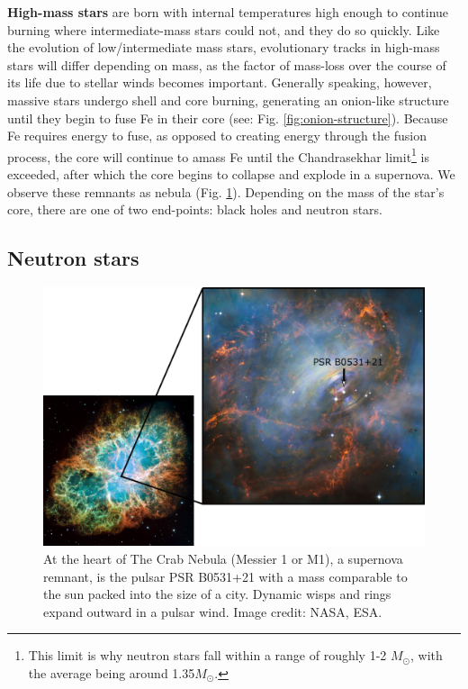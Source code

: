 \documentclass[1.5,11pt]{beavtex}
\begin{document}
\textbf{High-mass stars} are born with internal temperatures high enough to continue burning where intermediate-mass stars could not, and they do so quickly. Like the evolution of low/intermediate mass stars, evolutionary tracks in high-mass stars will differ depending on mass, as the factor of mass-loss over the course of its life due to stellar winds becomes important. Generally speaking, however, massive stars undergo shell and core burning, generating an onion-like structure until they begin to fuse Fe in their core (see: Fig. \ref{fig:onion-structure}). Because Fe requires energy to fuse, as opposed to creating energy through the fusion process, the core will continue to amass Fe until the Chandrasekhar limit\footnote{\selectfont This limit is why neutron stars fall within a range of roughly 1-2 \(M_\odot\), with the average being around 1.35\(M_\odot\). } is exceeded, after which the core begins to collapse and explode in a supernova. We observe these remnants as nebula (Fig. \ref{fig:crab-nebula}). Depending on the mass of the star's core, there are one of two end-points: black holes and neutron stars. 


\subsection{Neutron stars} 
\label{ch:Astro theory ssec:NSs}

\begin{figure}[ht!]
  \centering
  \includegraphics[scale=0.40]{images/ch2/Crab-nebula.png}
  \caption{\selectfont At the heart of The Crab Nebula (Messier 1 or M1), a supernova remnant, is the pulsar PSR B0531+21 with a mass comparable to the sun packed into the size of a city. Dynamic wisps and rings expand outward in a pulsar wind. Image credit: NASA, ESA.}
  \label{fig:crab-nebula}
\end{figure}
\end{document}
